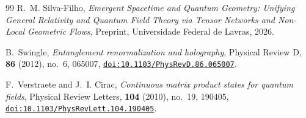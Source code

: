 \documentclass[11pt,a4paper,reqno]{amsart}
\theoremstyle{definition}
\numberwithin{equation}{section}
\providecommand{\doi}[1]{\href{https://doi.org/#1}{\nolinkurl{doi:#1}}}
\providecommand{\doi}[1]{\href{https://doi.org/#1}{\nolinkurl{doi:#1}}}
\begin{document}
\begin{thebibliography}{99}
R.~M. Silva-Filho,
\emph{Emergent Spacetime and Quantum Geometry: Unifying General Relativity and Quantum Field Theory via Tensor Networks and Non-Local Geometric Flows},
Preprint, Universidade Federal de Lavras, 2026.

B.~Swingle,
\emph{Entanglement renormalization and holography},
Physical Review D, \textbf{86} (2012), no.~6, 065007,
\doi{10.1103/PhysRevD.86.065007}.

F.~Verstraete and J.~I. Cirac,
\emph{Continuous matrix product states for quantum fields},
Physical Review Letters, \textbf{104} (2010), no.~19, 190405,
\doi{10.1103/PhysRevLett.104.190405}.

\end{thebibliography}
\end{document}
